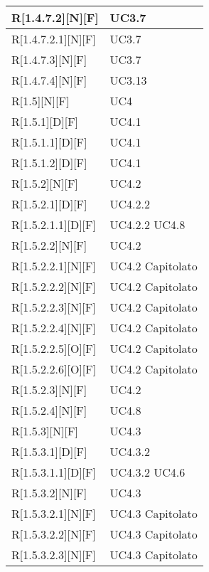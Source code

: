 \begin{longtable}{X | X}
\hline
R[1.4.7.2][N][F] & UC3.7 \\
\hline
R[1.4.7.2.1][N][F] & UC3.7 \\
\hline
R[1.4.7.3][N][F] & UC3.7 \\
\hline
R[1.4.7.4][N][F] & UC3.13 \\
\hline
R[1.5][N][F] & UC4 \\
\hline
R[1.5.1][D][F] & UC4.1 \\
\hline
R[1.5.1.1][D][F] & UC4.1 \\
\hline
R[1.5.1.2][D][F] & UC4.1 \\
\hline
R[1.5.2][N][F] & UC4.2 \\
\hline
R[1.5.2.1][D][F] & UC4.2.2 \\
\hline
R[1.5.2.1.1][D][F] & UC4.2.2 \newline UC4.8 \\
\hline
R[1.5.2.2][N][F] & UC4.2 \\
\hline
R[1.5.2.2.1][N][F] & UC4.2 \newline Capitolato \\
\hline
R[1.5.2.2.2][N][F] & UC4.2 \newline Capitolato \\
\hline
R[1.5.2.2.3][N][F] & UC4.2 \newline Capitolato \\
\hline
R[1.5.2.2.4][N][F] & UC4.2 \newline Capitolato \\
\hline
R[1.5.2.2.5][O][F] & UC4.2 \newline Capitolato \\
\hline
R[1.5.2.2.6][O][F] & UC4.2 \newline Capitolato \\
\hline
R[1.5.2.3][N][F] & UC4.2 \\
\hline
R[1.5.2.4][N][F] & UC4.8 \\
\hline
R[1.5.3][N][F] & UC4.3 \\
\hline
R[1.5.3.1][D][F] & UC4.3.2 \\
\hline
R[1.5.3.1.1][D][F] & UC4.3.2 \newline UC4.6 \\
\hline
R[1.5.3.2][N][F] & UC4.3 \\
\hline
R[1.5.3.2.1][N][F] & UC4.3 \newline Capitolato \\
\hline
R[1.5.3.2.2][N][F] & UC4.3 \newline Capitolato \\
\hline
R[1.5.3.2.3][N][F] & UC4.3 \newline Capitolato \\

\end{longtable}
